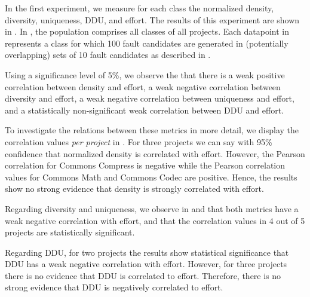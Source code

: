 \documentclass[twoside,a4paper,11pt]{memoir}
\begin{document}
In the first experiment, we measure for each class the normalized density, diversity, uniqueness, DDU, and effort.
The results of this experiment are shown in .
In , the population comprises all classes of all projects.
Each datapoint in  represents a class for which 100 fault candidates are generated in (potentially overlapping) sets of 10 fault candidates as described in .

Using a significance level of 5\%, we observe the that there is a weak positive correlation between density and effort, a weak negative correlation between diversity and effort, a weak negative correlation between uniqueness and effort, and a statistically non-significant weak correlation between DDU and effort.

To investigate the relations between these metrics in more detail, we display the correlation values \emph{per project} in .
For three projects we can say with 95\% confidence that normalized density is correlated with effort.
However, the Pearson correlation for Commons Compress is negative while the Pearson correlation values for Commons Math and Commons Codec are positive.
Hence, the results show no strong evidence that density is strongly correlated with effort.

Regarding diversity and uniqueness, we observe in  and  that both metrics have a weak negative correlation with effort, and that the correlation values in 4 out of 5 projects are statistically significant.

Regarding DDU, for two projects the results show statistical significance that DDU has a weak negative correlation with effort.
However, for three projects there is no evidence that DDU is correlated to effort.
Therefore, there is no strong evidence that DDU is negatively correlated to effort.
\end{document}
